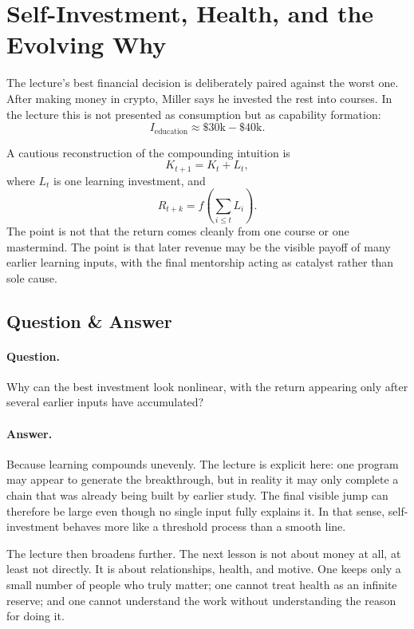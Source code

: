 \section{Self-Investment, Health, and the Evolving Why}

The lecture's best financial decision is deliberately paired against the worst one. After making money in crypto, Miller says he invested the rest into courses. In the lecture this is not presented as consumption but as capability formation:
\begin{equation}
I_{\text{education}} \approx \$30\text{k}-\$40\text{k}.
\end{equation}

A cautious reconstruction of the compounding intuition is
\begin{equation}
K_{t+1}=K_t+L_t,
\end{equation}
where \(L_t\) is one learning investment, and
\begin{equation}
R_{t+k}=f\!\left(\sum_{i\le t} L_i\right).
\end{equation}
The point is not that the return comes cleanly from one course or one mastermind. The point is that later revenue may be the visible payoff of many earlier learning inputs, with the final mentorship acting as catalyst rather than sole cause.

\subsection{Question \& Answer}

\paragraph{Question.} Why can the best investment look nonlinear, with the return appearing only after several earlier inputs have accumulated?

\paragraph{Answer.} Because learning compounds unevenly. The lecture is explicit here: one program may appear to generate the breakthrough, but in reality it may only complete a chain that was already being built by earlier study. The final visible jump can therefore be large even though no single input fully explains it. In that sense, self-investment behaves more like a threshold process than a smooth line.

The lecture then broadens further. The next lesson is not about money at all, at least not directly. It is about relationships, health, and motive. One keeps only a small number of people who truly matter; one cannot treat health as an infinite reserve; and one cannot understand the work without understanding the reason for doing it.

